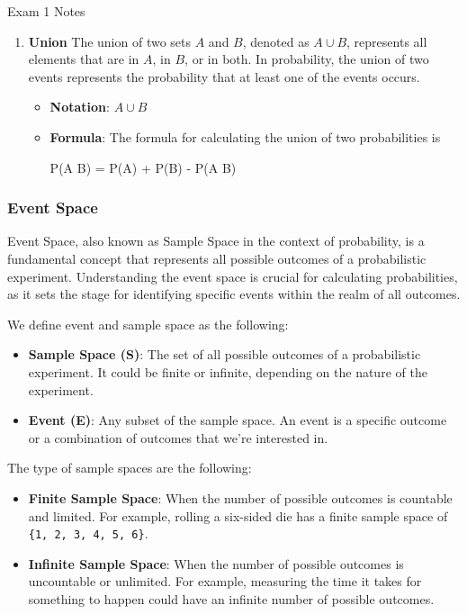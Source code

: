 \begin{examnotes}{Exam 1 Notes}
\begin{enumerate}
\begin{itemize}
\begin{itemize}
            \end{itemize}
        \end{itemize}
        \item \textbf{Union} The union of two sets $A$ and $B$, denoted as $A \cup B$, represents all elements that are in $A$, in $B$, or in both. In probability, the union of two events represents 
        the probability that at least one of the events occurs.
        \begin{itemize}
            \item \textbf{Notation}: $A \cup B$
            \item \textbf{Formula}: The formula for calculating the union of two probabilities is
            \begin{center}
                \begin{highlightbox}
                    P(A \cup B) = P(A) + P(B) - P(A \cap B)
                \end{highlightbox}
            \end{center}
        \end{itemize}
    \end{enumerate}

    \subsubsection*{Event Space}

    Event Space, also known as Sample Space in the context of probability, is a fundamental concept that represents all possible outcomes of a probabilistic experiment. Understanding the event space 
    is crucial for calculating probabilities, as it sets the stage for identifying specific events within the realm of all outcomes.

    We define event and sample space as the following:
    \begin{itemize}
        \item \textbf{Sample Space (S)}: The set of all possible outcomes of a probabilistic experiment. It could be finite or infinite, depending on the nature of the experiment.
        \item \textbf{Event (E)}: Any subset of the sample space. An event is a specific outcome or a combination of outcomes that we're interested in.
    \end{itemize}

    The type of sample spaces are the following:
    \begin{itemize}
        \item \textbf{Finite Sample Space}: When the number of possible outcomes is countable and limited. For example, rolling a six-sided die has a finite sample space of \texttt{\{1, 2, 3, 4, 5, 6\}}.
        \item \textbf{Infinite Sample Space}: When the number of possible outcomes is uncountable or unlimited. For example, measuring the time it takes for something to happen could have an infinite 
        number of possible outcomes.
    \end{itemize}


\end{examnotes}
